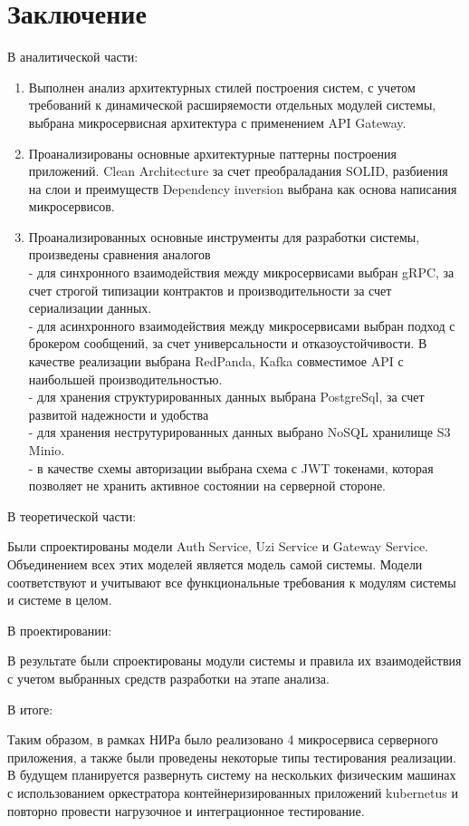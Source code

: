 \chapter*{Заключение}

В аналитической части: 



\begin{enumerate}
	\item Выполнен анализ архитектурных стилей построения систем, с учетом требований к динамической расширяемости отдельных модулей системы, выбрана микросервисная архитектура с применением API Gateway.
	\item Проанализированы основные архитектурные паттерны построения приложений. Clean Architecture за счет преобраладания SOLID, разбиения на слои и преимуществ Dependency inversion выбрана как основа написания микросервисов.
	\item Проанализированных основные инструменты для разработки системы, произведены сравнения аналогов\\
        - для синхронного взаимодействия между микросервисами выбран gRPC, за счет строгой типизации контрактов и производительности за счет сериализации данных.\\
        - для асинхронного взаимодействия между микросервисами выбран подход с брокером сообщений, за счет универсальности и отказоустойчивости. В качестве реализации выбрана RedPanda, Kafka совместимое API с наибольшей производительностью.\\
        - для хранения структурированных данных выбрана PostgreSql, за счет развитой надежности и удобства\\
        - для хранения неструтурированных данных выбрано NoSQL хранилище S3 Minio.\\
        - в качестве схемы авторизации выбрана схема с JWT токенами, которая позволяет не хранить активное состоянии на серверной стороне.\\
\end{enumerate}


В теоретической части:


Были спроектированы модели Auth Service, Uzi Service и Gateway Service. Объединением всех этих моделей является
модель самой системы. Модели соответствуют и учитывают все функциональные требования к модулям системы и системе в целом.


В проектировании:


В результате были спроектированы модули системы и правила их взаимодействия с учетом выбранных средств разработки
на этапе анализа.


В итоге:


Таким образом, в рамках НИРа было реализовано 4 микросервиса серверного приложения, а также были проведены некоторые типы тестирования реализации. 
В будущем планируется развернуть систему на нескольких физическим машинах с использованием оркестратора контейнеризированных приложений 
kubernetus и повторно провести нагрузочное и интеграционное тестирование.

